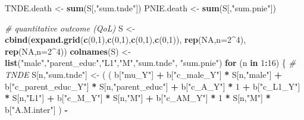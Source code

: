 \documentclass[
]{book}
\newenvironment{Shaded}{\begin{snugshade}}{\end{snugshade}}
\newcommand{\AttributeTok}[1]{\textcolor[rgb]{0.13,0.29,0.53}{#1}}
\newcommand{\CommentTok}[1]{\textcolor[rgb]{0.56,0.35,0.01}{\textit{#1}}}
\newcommand{\ConstantTok}[1]{\textcolor[rgb]{0.56,0.35,0.01}{#1}}
\newcommand{\ControlFlowTok}[1]{\textcolor[rgb]{0.13,0.29,0.53}{\textbf{#1}}}
\newcommand{\DecValTok}[1]{\textcolor[rgb]{0.00,0.00,0.81}{#1}}
\newcommand{\FunctionTok}[1]{\textcolor[rgb]{0.13,0.29,0.53}{\textbf{#1}}}
\newcommand{\NormalTok}[1]{#1}
\newcommand{\OtherTok}[1]{\textcolor[rgb]{0.56,0.35,0.01}{#1}}
\newcommand{\SpecialCharTok}[1]{\textcolor[rgb]{0.81,0.36,0.00}{\textbf{#1}}}
\newcommand{\StringTok}[1]{\textcolor[rgb]{0.31,0.60,0.02}{#1}}
\begin{document}
\begin{Shaded}
\begin{Highlighting}[]
\NormalTok{  TNDE.death }\OtherTok{\textless{}{-}} \FunctionTok{sum}\NormalTok{(S[,}\StringTok{"sum.tnde"}\NormalTok{])}
\NormalTok{  PNIE.death }\OtherTok{\textless{}{-}} \FunctionTok{sum}\NormalTok{(S[,}\StringTok{"sum.pnie"}\NormalTok{])}
  
  \CommentTok{\# quantitative outcome (QoL)}
\NormalTok{  S }\OtherTok{\textless{}{-}} \FunctionTok{cbind}\NormalTok{(}\FunctionTok{expand.grid}\NormalTok{(}\FunctionTok{c}\NormalTok{(}\DecValTok{0}\NormalTok{,}\DecValTok{1}\NormalTok{),}\FunctionTok{c}\NormalTok{(}\DecValTok{0}\NormalTok{,}\DecValTok{1}\NormalTok{),}\FunctionTok{c}\NormalTok{(}\DecValTok{0}\NormalTok{,}\DecValTok{1}\NormalTok{),}\FunctionTok{c}\NormalTok{(}\DecValTok{0}\NormalTok{,}\DecValTok{1}\NormalTok{)), }\FunctionTok{rep}\NormalTok{(}\ConstantTok{NA}\NormalTok{,}\AttributeTok{n=}\DecValTok{2}\SpecialCharTok{\^{}}\DecValTok{4}\NormalTok{), }\FunctionTok{rep}\NormalTok{(}\ConstantTok{NA}\NormalTok{,}\AttributeTok{n=}\DecValTok{2}\SpecialCharTok{\^{}}\DecValTok{4}\NormalTok{))}
  \FunctionTok{colnames}\NormalTok{(S) }\OtherTok{\textless{}{-}} \FunctionTok{list}\NormalTok{(}\StringTok{"male"}\NormalTok{,}\StringTok{"parent\_educ"}\NormalTok{,}\StringTok{"L1"}\NormalTok{,}\StringTok{"M"}\NormalTok{,}\StringTok{"sum.tnde"}\NormalTok{, }\StringTok{"sum.pnie"}\NormalTok{)}
  \ControlFlowTok{for}\NormalTok{ (n }\ControlFlowTok{in} \DecValTok{1}\SpecialCharTok{:}\DecValTok{16}\NormalTok{) \{}
    \CommentTok{\# TNDE }
\NormalTok{    S[n,}\StringTok{"sum.tnde"}\NormalTok{] }\OtherTok{\textless{}{-}}\NormalTok{ ( ( b[}\StringTok{"mu\_Y"}\NormalTok{] }\SpecialCharTok{+} 
\NormalTok{                             b[}\StringTok{"c\_male\_Y"}\NormalTok{] }\SpecialCharTok{*}\NormalTok{ S[n,}\StringTok{"male"}\NormalTok{] }\SpecialCharTok{+} 
\NormalTok{                             b[}\StringTok{"c\_parent\_educ\_Y"}\NormalTok{] }\SpecialCharTok{*}\NormalTok{ S[n,}\StringTok{"parent\_educ"}\NormalTok{] }\SpecialCharTok{+} 
\NormalTok{                             b[}\StringTok{"c\_A\_Y"}\NormalTok{] }\SpecialCharTok{*} \DecValTok{1} \SpecialCharTok{+} 
\NormalTok{                             b[}\StringTok{"c\_L1\_Y"}\NormalTok{] }\SpecialCharTok{*}\NormalTok{ S[n,}\StringTok{"L1"}\NormalTok{] }\SpecialCharTok{+}
\NormalTok{                             b[}\StringTok{"c\_M\_Y"}\NormalTok{] }\SpecialCharTok{*}\NormalTok{ S[n,}\StringTok{"M"}\NormalTok{] }\SpecialCharTok{+}
\NormalTok{                             b[}\StringTok{"c\_AM\_Y"}\NormalTok{] }\SpecialCharTok{*} \DecValTok{1} \SpecialCharTok{*}\NormalTok{ S[n,}\StringTok{"M"}\NormalTok{] }\SpecialCharTok{*}\NormalTok{ b[}\StringTok{"A.M.inter"}\NormalTok{] ) }\SpecialCharTok{{-}} 

\end{Highlighting}
\end{Shaded}
\end{document}
